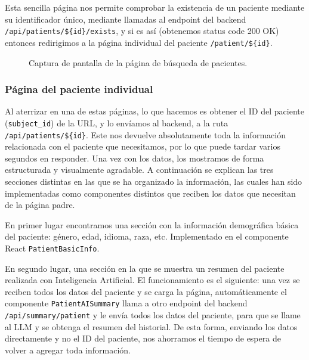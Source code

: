 Esta sencilla página nos permite comprobar la existencia de un paciente mediante su identificador único, mediante llamadas al endpoint del backend \texttt{/api/patients/\$\{id\}/exists}, y si es así (obtenemos status code 200 OK) entonces redirigimos a la página individual del paciente \texttt{/patient/\$\{id\}}. 

\begin{figure}[H]
  \centering
  \caption{Captura de pantalla de la página de búsqueda de pacientes.}
  \label{fig:search}
\end{figure}

\subsubsection{Página del paciente individual}

Al aterrizar en una de estas páginas, lo que hacemos es obtener el ID del paciente (\texttt{subject\_id}) de la URL, y lo envíamos al backend, a la ruta \texttt{/api/patients/\$\{id\}}. Este nos devuelve absolutamente toda la información relacionada con el paciente que necesitamos, por lo que puede tardar varios segundos en responder. Una vez con los datos, los mostramos de forma estructurada y visualmente agradable. A continuación se explican las tres secciones distintas en las que se ha organizado la información, las cuales han sido implementadas como componentes distintos que reciben los datos que necesitan de la página padre.

En primer lugar encontramos una sección con la información demográfica básica del paciente: género, edad, idioma, raza, etc. Implementado en el componente React \texttt{PatientBasicInfo}.

En segundo lugar, una sección en la que se muestra un resumen del paciente realizada con Inteligencia Artificial. El funcionamiento es el siguiente: una vez se reciben todos los datos del paciente y se carga la página, automáticamente el componente \texttt{PatientAISummary} llama a otro endpoint del backend \texttt{/api/summary/patient} y le envía todos los datos del paciente, para que se llame al LLM y se obtenga el resumen del historial. De esta forma, enviando los datos directamente y no el ID del paciente, nos ahorramos el tiempo de espera de volver a agregar toda información.

